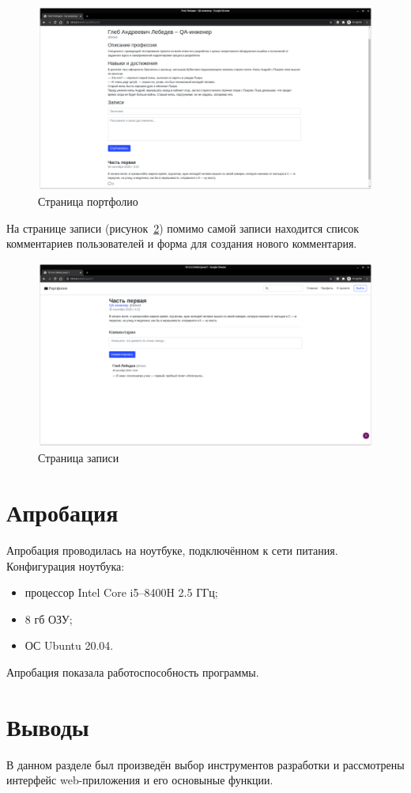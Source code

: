 \begin{figure}[H]
    \centering
    \includegraphics[scale=0.235]{images/scr_05.png}
    \caption{Страница портфолио}\label{img:scr_05}
\end{figure}

На странице записи (рисунок~\ref{img:scr_06}) помимо самой записи находится список комментариев пользователей и форма для создания нового комментария.

\begin{figure}[H]
    \centering
    \includegraphics[scale=0.235]{images/scr_06.png}
    \caption{Страница записи}\label{img:scr_06}
\end{figure}

\section{Апробация}%
\label{sec:aprobatsiia}
Апробация проводилась на ноутбуке, подключённом к сети питания. Конфигурация ноутбука:
\begin{itemize}
    \item процессор Intel Core i5--8400H 2.5 ГГц;
    \item 8 гб ОЗУ;
    \item ОС Ubuntu 20.04.
\end{itemize}

Апробация показала работоспособность программы.

\section{Выводы}%
\label{sec:vyvody_impl}

В данном разделе был произведён выбор инструментов разработки и рассмотрены интерфейс web-приложения и его основыные функции.
